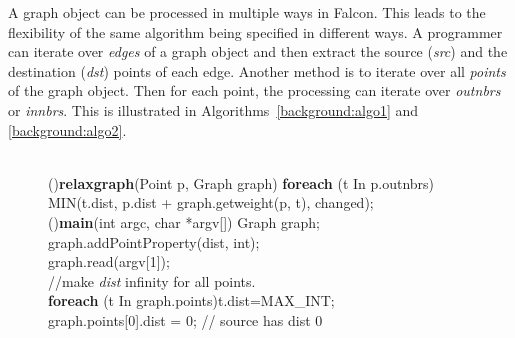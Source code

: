 A graph object can be processed in multiple ways in Falcon. This leads to the flexibility of the same algorithm being specified in different ways.   A programmer can iterate over {\it edges} of a graph object and then extract the source ({\it src}) and the destination ({\it dst}) points of each edge. Another method is to iterate over all {\it points} of the graph object. 
Then for each point, the processing can iterate over {\it outnbrs} or {\it innbrs}.
This is illustrated in Algorithms~\ref{background:algo1} and \ref{background:algo2}.

\begin{figure}
\begin{minipage}[t]{0.45\textwidth}
\begin{algorithm}[H]
\small
{}
\fontsize{8.2pt}{5pt}\\
\Fn(){\textbf{relaxgraph}(Point  p, Graph  graph)} {
                        \textbf{foreach} (t In p.outnbrs)\\
        \hspace{0.05in} MIN(t.dist, p.dist + graph.getweight(p, t), changed);    \label{line:modidist}\\%
}
\Fn(){\textbf{main}(int argc, char *argv[])} {
        Graph graph;    \\
        graph.addPointProperty(dist, int);      \label{line:add-dist}\\
        graph.read(argv[1]);            \label{line:readgraph}  \\
        //make {\it dist} infinity for all points.\\
        \textbf{foreach} (t In graph.points)t.dist=MAX\_INT;     \label{line:infinity}\\
        graph.points[0].dist = 0;       // source has dist 0    \label{line:initsource} \\
        }
\end{algorithm}
\end{minipage}
\end{figure}

